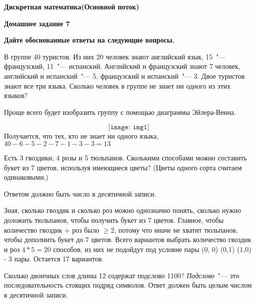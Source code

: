 \documentclass[11pt]{article}
\def\week{7}
\def\theproblem{К\week.\arabic{problem}}
\begin{document}
	\setcounter{problem}{0}
	\def\theproblem{Д\week.\arabic{problem}}
	{\textbf{\large Дискретная математика}\hfill \textbf{(Основной поток)}
		
		\medskip %
		
		\textbf{Домашнее задание \week}}
	
	\medskip
	
	\textbf{Дайте обоснованные ответы на следующие вопросы.}
	
	
	\vspace{5mm}
	
	\p В группе 40 туристов. Из них 20 человек знают английский язык,
	15~"--- французский, 11~"--- испанский. Английский и французский знают
	7 человек, английский и испанский~"--- 5, французский и испанский~"---
	3. Двое туристов знают все три языка. Сколько человек в группе не
	знает ни одного из этих языков? 
	
	Проще всего будет изобразить группу с помощью диаграммы Эйлера-Венна. \sspace
	
	\[\texttt{[image: img1]}\] \sspace
	Получается, что тех, кто не знает ни одного языка, $40 - 6 - 5 - 2 - 7 - 1 - 3 - 3 = 13$
	\sspace	
	\sspace
	
	\p Есть 3 гвоздики, 4 розы и 5 тюльпанов.
	Сколькими способами
	можно составить букет из 7 цветов, используя  имеющиеся цветы?
	(Цветы одного сорта считаем одинаковыми.)
	
	Ответом должно быть число в десятичной записи.
	
	Зная, сколько гвоздик и сколько роз можно однозначно понять, сколько нужно доложить тюльпанов, чтобы получить букет из 7 цветов. Главное, чтобы количество гвоздик + роз было $\geq 2$, потому что иначе не хватит тюльпанов, чтобы дополнить букет до 7 цветов. Всего вариантов выбрать количество гвоздик и роз $4 * 5 = 20$ способов, из них не подойдут под условие пары (0, 0) (0,1) (1,0) - 3 пары. Остается 17 вариантов. \sspace
	
	\p Сколько двоичных слов длины 12 содержат подслово 1100?
	\emph{Подслово}~"--- это последовательность стоящих подряд символов.
	Ответ должен быть целым числом в десятичной записи.
	
\end{document}
